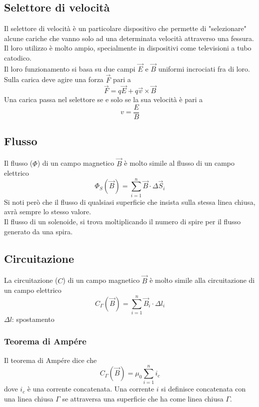 \subsection{Selettore di velocità}
Il selettore di velocità è un particolare dispositivo che permette di "selezionare" alcune cariche che
vanno solo ad una determinata velocità attraverso una fessura. Il loro utilizzo è molto ampio, 
specialmente in dispositivi come televisioni a tubo catodico.\\
Il loro funzionamento si basa su due campi $\vec{E}$ e $\vec{B}$ uniformi incrociati fra di loro.\\
Sulla carica deve agire una forza $\vec{F}$ pari a
\begin{equation*}
\vec{F} = q\vec{E} + q\vec{v}\times\vec{B}
\end{equation*}
Una carica passa nel selettore se e solo se la sua velocità è pari a
\begin{equation*}
v = \frac{E}{B}
\end{equation*}

\subsection{Flusso}
Il flusso ($\Phi$) di un campo magnetico $\vec{B}$ è molto simile al flusso di un campo elettrico
\begin{equation*}
  \Phi_S(\vec{B}) = \sum^n_{i=1} \vec{B}\cdot\Delta\vec{S}_i
\end{equation*}
Si noti però che il flusso di qualsiasi superficie che insista sulla stessa linea chiusa, avrà
sempre lo stesso valore.\\
Il flusso di un solenoide, si trova moltiplicando il numero di spire per il flusso generato da una
spira.

\subsection{Circuitazione}
La circuitazione ($C$) di un campo magnetico $\vec{B}$ è molto simile alla circuitazione
di un campo elettrico
\begin{equation*}
  C_\Gamma(\vec{B}) = \sum^{n}_{i=1}\vec{B}_i\cdot\Delta l_i
\end{equation*}
$\Delta l$: spostamento

\subsubsection{Teorema di Ampére}
Il teorema di Ampére dice che
\begin{equation*}
  C_\Gamma(\vec{B}) = \mu_0 \sum\limits^{n}_{i=1} i_c
\end{equation*}
dove $i_c$ è una corrente concatenata. Una corrente $i$ si definisce concatenata con una linea
chiusa $\Gamma$ se attraversa una superficie che ha come linea chiusa $\Gamma$.

